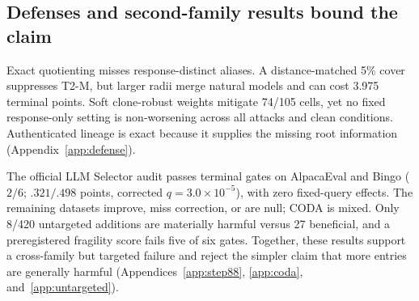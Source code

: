 \subsection{Defenses and second-family results bound the claim}

Exact quotienting misses response-distinct aliases. A distance-matched 5\% cover suppresses T2-M, but larger radii merge natural models and can cost 3.975 terminal points. Soft clone-robust weights mitigate 74/105 cells, yet no fixed response-only setting is non-worsening across all attacks and clean conditions. Authenticated lineage is exact because it supplies the missing root information (Appendix~\ref{app:defense}).

The official LLM Selector audit passes terminal gates on AlpacaEval and Bingo ($2/6$; $.321/.498$ points, corrected $q=3.0\times10^{-5}$), with zero fixed-query effects. The remaining datasets improve, miss correction, or are null; CODA is mixed. Only 8/420 untargeted additions are materially harmful versus 27 beneficial, and a preregistered fragility score fails five of six gates. Together, these results support a cross-family but targeted failure and reject the simpler claim that more entries are generally harmful (Appendices~\ref{app:step88}, \ref{app:coda}, and~\ref{app:untargeted}).
\FloatBarrier
